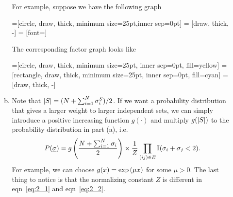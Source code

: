 \documentclass[a4paper,oneside,12pt]{article}
\begin{document}
\begin{itemize}
\begin{solution}
\begin{enumerate}[(a)]
            For example, suppose we have the following graph
            \begin{center}
            =[circle, draw, thick, minimum size=25pt,inner sep=0pt]
             = [draw, thick, -]
             = [font=\small]
            \end{center}
            The corresponding factor graph looks like
            \begin{center}
            =[circle, draw, thick, minimum size=25pt, inner sep=0pt, fill=yellow]
            =[rectangle, draw, thick, minimum size=25pt, inner sep=0pt, fill=cyan]
             = [draw, thick, -]
            \end{center}
    \item   
            Note that $ \left| S \right| = (N + \sum_{i=1}^N \sigma_i^S) / 2 $.
            If we want a probability distribution that gives a larger weight to larger independent sets, we can simply introduce a positive increasing function $ g(\cdot) $ and multiply $ g(\left| S \right|) $ to the probability distribution in part (a), i.e.
            \begin{equation} \label{eq:2_2}
                P(\underline{\sigma})
                = g \left(  \frac{N + \sum_{i=1}^N \sigma_i}{2}  \right) \times \frac{1}{Z} \prod_{(ij) \in E} \mathbb{I}(\sigma_i + \sigma_j < 2).
            \end{equation}
            For example, we can choose $ g(x) = \exp \left(  \mu x  \right) $ for some $ \mu > 0 $.
            The last thing to notice is that the normalizing constant $ Z $ is different in eqn~\ref{eq:2_1} and eqn~\ref{eq:2_2}.
    \end{enumerate}
    \end{solution}


\end{itemize}
\end{document}
